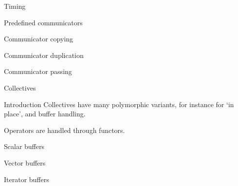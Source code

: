 \documentclass[11pt,headernav]{beamer}
\begin{document}
\begin{numberedframe}{Timing}
  
\end{numberedframe}
\begin{numberedframe}{Predefined communicators}
  
\end{numberedframe}
\begin{numberedframe}{Communicator copying}
  
\end{numberedframe}
\begin{numberedframe}{Communicator duplication}
  
\end{numberedframe}
\begin{numberedframe}{Communicator passing}
  
\end{numberedframe}

 {Collectives}

\begin{frame}{Introduction}
  Collectives have many polymorphic variants, for instance for `in place',
  and buffer handling.

  Operators are handled through functors.
\end{frame}
\begin{numberedframe}{Scalar buffers}
  
\end{numberedframe}
\begin{numberedframe}{Vector buffers}
  
\end{numberedframe}
\begin{numberedframe}{Iterator buffers}
  
\end{numberedframe}
\end{document}
